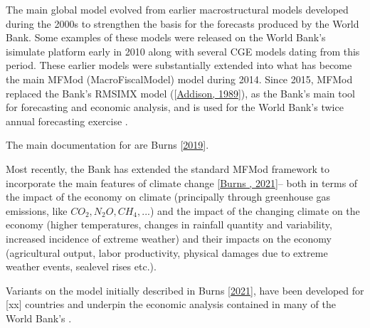 \documentclass[letterpaper,10pt,english]{jupyterBook}
\begin{document}
\sphinxAtStartPar
The main  global model evolved from earlier macro\sphinxhyphen{}structural models developed during the 2000s to strengthen the basis for the forecasts produced by the World Bank. Some examples of these models were released on the World Bank’s isimulate platform early in 2010 along with several CGE models dating from this period. These earlier models were substantially extended into what has become the main MFMod (MacroFiscalModel) model during 2014. Since 2015, MFMod replaced the Bank’s RMSIM\sphinxhyphen{}X model ({[}\hyperlink{cite.content/99_BackMatter/References:id20}{Addison, 1989}{]}), as the Bank’s main tool for forecasting and economic analysis, and is used for the World Bank’s twice annual forecasting exercise .

\sphinxAtStartPar
The main documentation for  are Burns  {[}\hyperlink{cite.content/99_BackMatter/References:id15}{2019}{]}.

\begin{DUlineblock}{0em}
\item[] 
\end{DUlineblock}

\sphinxAtStartPar
Most recently, the Bank has extended the standard MFMod framework to incorporate the main features of climate change {[}\hyperlink{cite.content/99_BackMatter/References:id14}{Burns , 2021}{]}– both in terms of the impact of the economy on climate (principally through green\sphinxhyphen{}house gas emissions, like \(CO_2, N_{2}O, CH_4, ...\)) and the impact of the changing climate on the economy (higher temperatures, changes in rainfall quantity and variability, increased incidence of extreme weather) and their impacts on the economy (agricultural output, labor productivity, physical damages due to extreme weather events, sea\sphinxhyphen{}level rises etc.).

\sphinxAtStartPar
Variants on the model initially described in  Burns  {[}\hyperlink{cite.content/99_BackMatter/References:id14}{2021}{]}, have been developed for {[}xx{]} countries and underpin the economic analysis contained in many of the World Bank’s  .
\end{document}
